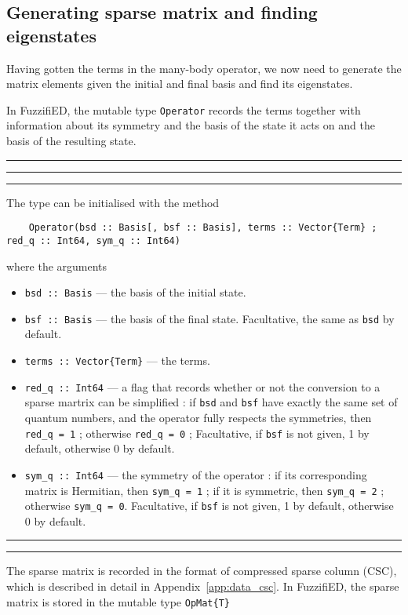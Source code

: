 \documentclass{timesjhep}
\newenvironment{block}[1]{\vspace{0.4\baselineskip}\hrule\vspace{0.10\baselineskip}\hrule\vspace{0.30\baselineskip}{\bfseries #1}\vspace{0.2\baselineskip}\hrule\vspace{0.3\baselineskip}
}{\vspace{0.2\baselineskip}\hrule\vspace{0.10\baselineskip}\hrule\vspace{0.5\baselineskip}}
\begin{document}
\subsection{Generating sparse matrix and finding eigenstates}

Having gotten the terms in the many-body operator, we now need to generate the matrix elements given the initial and final basis and find its eigenstates. 

In FuzzifiED, the mutable type \lstinline|Operator| records the terms together with information about its symmetry and the basis of the state it acts on and the basis of the resulting state. 

\begin{block}{\lstinline|Operator| --- Type}
The type can be initialised with the method 
\begin{lstlisting}
    Operator(bsd :: Basis[, bsf :: Basis], terms :: Vector{Term} ; red_q :: Int64, sym_q :: Int64)
\end{lstlisting}
where the arguments 
\begin{itemize}
    \item \lstinline|bsd :: Basis| --- the basis of the initial state.
    \item \lstinline|bsf :: Basis| --- the basis of the final state. Facultative, the same as \lstinline|bsd| by default. 
    \item \lstinline|terms :: Vector{Term}| --- the terms.
    \item \lstinline|red_q :: Int64| --- a flag that records whether or not the conversion to a sparse martrix can be simplified : if \lstinline|bsd| and \lstinline|bsf| have exactly the same set of quantum numbers, and the operator fully respects the symmetries, then \lstinline|red_q = 1| ; otherwise \lstinline|red_q = 0| ; Facultative, if \lstinline|bsf| is not given, 1 by default, otherwise 0 by default.
    \item \lstinline|sym_q :: Int64| --- the symmetry of the operator : if its corresponding matrix is Hermitian, then \lstinline|sym_q = 1| ; if it is symmetric, then \lstinline|sym_q = 2| ; otherwise \lstinline|sym_q = 0|. Facultative, if \lstinline|bsf| is not given, 1 by default, otherwise 0 by default.
\end{itemize}
\end{block}

The sparse matrix is recorded in the format of compressed sparse column (CSC), which is described in detail in Appendix~\ref{app:data_csc}. In FuzzifiED, the sparse matrix is stored in the mutable type \lstinline|OpMat{T}|
\end{document}
